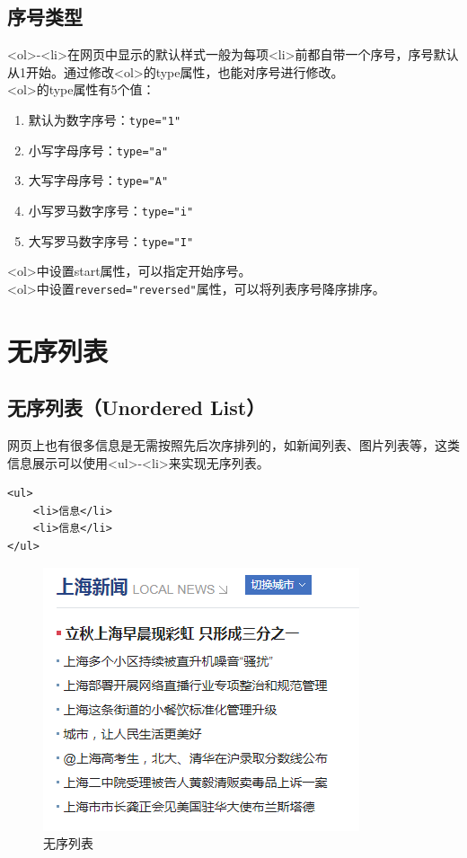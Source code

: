 \subsection{序号类型}

<ol>-<li>在网页中显示的默认样式一般为每项<li>前都自带一个序号，序号默认从1开始。通过修改<ol>的type属性，也能对序号进行修改。 \\

<ol>的type属性有5个值：

\begin{enumerate}
	\item 默认为数字序号：\lstinline|type="1"|
	\item 小写字母序号：\lstinline|type="a"|
	\item 大写字母序号：\lstinline|type="A"|
	\item 小写罗马数字序号：\lstinline|type="i"|
	\item 大写罗马数字序号：\lstinline|type="I"|
\end{enumerate}

<ol>中设置start属性，可以指定开始序号。 \\

<ol>中设置\lstinline|reversed="reversed"|属性，可以将列表序号降序排序。

\newpage

\section{无序列表}

\subsection{无序列表（Unordered List）}

网页上也有很多信息是无需按照先后次序排列的，如新闻列表、图片列表等，这类信息展示可以使用<ul>-<li>来实现无序列表。

\begin{lstlisting}[style=htmlcssjs]
<ul>
    <li>信息</li>
    <li>信息</li>
</ul>
\end{lstlisting}

\begin{figure}[H]
	\centering
	\includegraphics[scale=0.8]{img/C3/3-2/1.png}
	\caption{无序列表}
\end{figure}

